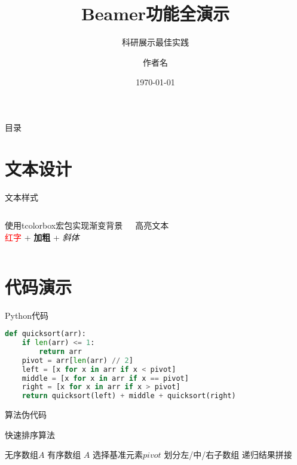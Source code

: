 \documentclass[aspectratio=169]{beamer}
\title{Beamer功能全演示}
\subtitle{科研展示最佳实践}
\author{作者名}
\institute{单位名称}
\date{\today}
\begin{document}
\begin{frame}[plain]
    \titlepage
\end{frame}

\begin{frame}{目录}
    \tableofcontents[pausesections]  %
\end{frame}

\section{文本设计}
\begin{frame}{文本样式}
    \begin{columns}
        \begin{tcolorbox}[colback=blue!5!white,colframe=blue!75!black,title=彩色文本框]
            使用tcolorbox宏包实现渐变背景\\
            \textcolor{red}{红字} + \textbf{加粗} + \emph{斜体}
        \end{tcolorbox}

        \colorbox{yellow!40}{高亮文本} \\
         \\
        \setlength{\fboxrule}{2pt}
    \end{columns}
\end{frame}

\section{代码演示}
\begin{frame}[fragile]{Python代码}
\begin{lstlisting}[language=Python]
def quicksort(arr):
    if len(arr) <= 1:
        return arr
    pivot = arr[len(arr) // 2]
    left = [x for x in arr if x < pivot]
    middle = [x for x in arr if x == pivot]
    right = [x for x in arr if x > pivot]
    return quicksort(left) + middle + quicksort(right)
\end{lstlisting}
\end{frame}

\begin{frame}{算法伪代码}
\begin{algorithm}[H]
\caption{快速排序算法}
\begin{algorithmic}[1]
\REQUIRE 无序数组$A$
\ENSURE 有序数组
    \RETURN $A$
\ENDIF
\STATE 选择基准元素$pivot$
\STATE 划分左/中/右子数组
\RETURN 递归结果拼接
\end{algorithmic}
\end{algorithm}
\end{frame}
\end{document}
